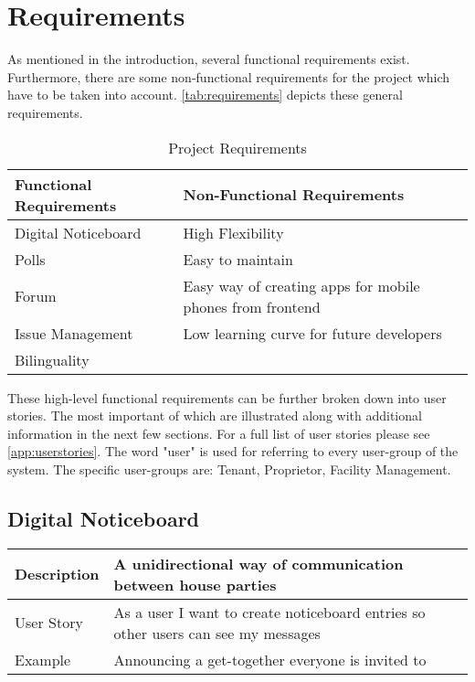 \section{Requirements} \label{sec:requirements}
As mentioned in the introduction, several functional requirements exist. Furthermore, there are some non-functional requirements for the project which have to be taken into account. \autoref{tab:requirements} depicts these general requirements. \newline

\begin{table}[H]
    \begin{center}
      \begin{tabularx}{\linewidth}{l|l} %
        \textbf{Functional Requirements} & \textbf{Non-Functional Requirements}\\
        \hline
        Digital Noticeboard & High Flexibility \\
        Polls & Easy to maintain\\
        Forum & Easy way of creating apps for mobile phones from frontend\\
        Issue Management & Low learning curve for future developers\\
        Bilinguality & \\
      \end{tabularx}
      \caption{Project Requirements}
      \label{tab:requirements}
    \end{center}
  \end{table}

These high-level functional requirements can be further broken down into user stories. The most important of which are illustrated along with additional information in the next few sections. For a full list of user stories please see \autoref{app:userstories}. The word "user" is used for referring to every user-group of the system. The specific user-groups are: Tenant, Proprietor, Facility Management.

\subsection{Digital Noticeboard}
\begin{table}[H]
  \begin{tabularx}{\linewidth}{l|X}
     Description & A unidirectional way of communication between house parties \\
     \hline
     User Story &  As a user I want to create noticeboard entries so other users can see my messages \\
     \hline
     Example & Announcing a get-together everyone is invited to 
  \end{tabularx}
\end{table}

